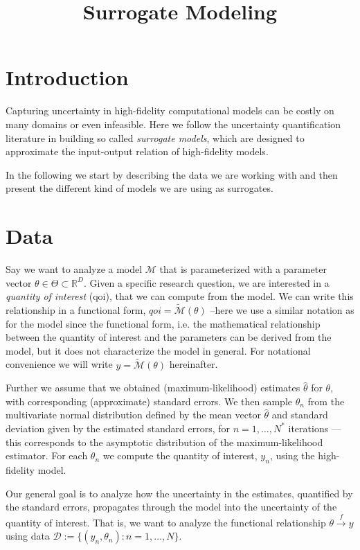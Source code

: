 \documentclass[a4paper, 12pt]{article}
\title{Surrogate Modeling}
\date{}
\begin{document}
\maketitle

\section{Introduction}

Capturing uncertainty in high-fidelity computational models can be costly on many domains or even infeasible.
Here we follow the uncertainty quantification literature in building so called \textit{surrogate models}, which are designed to approximate the input-output relation of high-fidelity models.

In the following we start by describing the data we are working with and then present the different kind of models we are using as surrogates.

\section{Data}

Say we want to analyze a model $\mathcal{M}$ that is parameterized with a parameter vector $\theta \in \Theta \subset \mathbb{R}^D$.
Given a specific research question, we are interested in a \textit{quantity of interest} (qoi), that we can compute from the model.
We can write this relationship in a functional form, $qoi = \tilde{\mathcal{M}}(\theta)$ --here we use a similar notation as for the model since the functional form, i.e. the mathematical relationship between the quantity of interest and the parameters can be derived from the model, but it does not characterize the model in general. For notational convenience we will write $y = \tilde{\mathcal{M}}(\theta)$ hereinafter.

Further we assume that we obtained (maximum-likelihood) estimates $\hat{\theta}$ for $\theta$, with corresponding (approximate) standard errors.
We then sample $\theta_n$ from the multivariate normal distribution defined by the mean vector $\hat{\theta}$ and standard deviation given by the estimated standard errors, for $n=1,\dots,N^*$ iterations ---this corresponds to the asymptotic distribution of the maximum-likelihood estimator.
For each $\theta_n$ we compute the quantity of interest, $y_n$, using the high-fidelity model.

Our general goal is to analyze how the uncertainty in the estimates, quantified by the standard errors, propagates through the model into the uncertainty of the quantity of interest.
That is, we want to analyze the functional relationship $\theta \overset{f}{\longrightarrow} y$ using data $\mathcal{D} := \{(y_n, \theta_n) : n=1,\dots, N\}$.%
\end{document}
